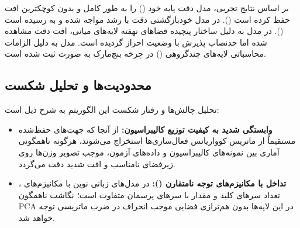 بر اساس نتایج تجربی، مدل  دقت پایه خود () را به طور کامل و بدون کوچکترین افت حفظ کرده است (). در مدل خودبازگشتی  دقت با رشد مواجه شده و به  رسیده است (). در مدل  به دلیل ساختار پیچیده فضاهای نهفته لایه‌های میانی، افت دقت  مشاهده شده اما حدنصاب پذیرش با وضعیت  احراز گردیده است. مدل  به دلیل الزامات محاسباتی لایه‌های چندگروهی () در چرخه بنچ‌مارک به صورت  ثبت شده است.

\subsection{محدودیت‌ها و تحلیل شکست}
تحلیل چالش‌ها و رفتار شکست این الگوریتم به شرح ذیل است:
\begin{itemize}
    \item \textbf{وابستگی شدید به کیفیت توزیع کالیبراسیون:} از آنجا که جهت‌های حفظ‌شده مستقیماً از ماتریس کوواریانس فعال‌سازی‌ها استخراج می‌شوند، هرگونه ناهمگونی آماری بین نمونه‌های کالیبراسیون و داده‌های آزمون، موجب تصویر وزن‌ها روی زیرفضای نامناسب و افت شدید دقت می‌گردد.
    \item \textbf{تداخل با مکانیزم‌های توجه نامتقارن ():} در مدل‌های زبانی نوین با مکانیزم‌های ، تعداد سرهای کلید و مقدار با سرهای پرسمان متفاوت است؛ نگاشت ناهمگون PCA در این لایه‌ها بدون هم‌ترازی فضایی موجب انحراف در ضرب ماتریسی توجه خواهد شد.
\end{itemize}
